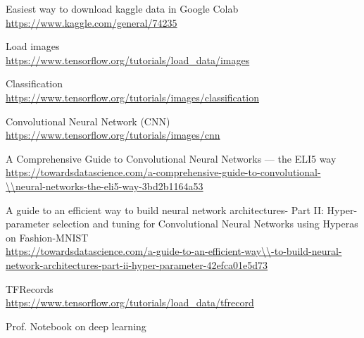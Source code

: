 \documentclass[a4paper,12pt]{article}
\begin{document}
\newpage
{}
\begin{thebibliography}{9}
Easiest way to download kaggle data in Google Colab\\
\url{https://www.kaggle.com/general/74235}

Load images\\
\url{https://www.tensorflow.org/tutorials/load_data/images}

Classification\\
\url{https://www.tensorflow.org/tutorials/images/classification}

Convolutional Neural Network (CNN)\\
\url{https://www.tensorflow.org/tutorials/images/cnn} 

A Comprehensive Guide to Convolutional Neural Networks — the ELI5 way\\
\url{https://towardsdatascience.com/a-comprehensive-guide-to-convolutional-\\neural-networks-the-eli5-way-3bd2b1164a53} 

A guide to an efficient way to build neural network architectures- Part II: Hyper-parameter selection and tuning for Convolutional Neural Networks using Hyperas on Fashion-MNIST\\
\url{https://towardsdatascience.com/a-guide-to-an-efficient-way\\-to-build-neural-network-architectures-part-ii-hyper-parameter-42efca01e5d73} 

TFRecords\\
\url{https://www.tensorflow.org/tutorials/load_data/tfrecord}

Prof. Notebook on deep learning\\







\end{thebibliography}
\end{document}
